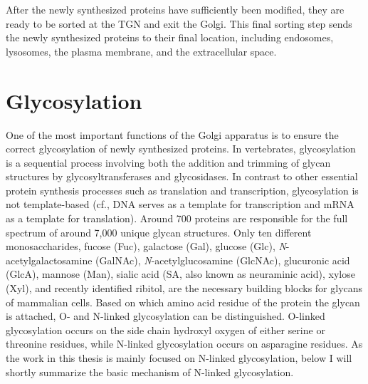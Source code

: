 After the newly synthesized proteins have sufficiently been modified, they are ready to be sorted at the TGN and exit the Golgi\cite{guo_protein_2014}. This final sorting step sends the newly synthesized proteins to their final location, including endosomes, lysosomes, the plasma membrane, and the extracellular space.


\section{Glycosylation}

One of the most important functions of the Golgi apparatus is to ensure the correct glycosylation of newly synthesized proteins. In vertebrates, glycosylation is a sequential process involving both the addition and trimming of glycan structures by glycosyltransferases and glycosidases\cite{lombard_carbohydrate-active_2014}. In contrast to other essential protein synthesis processes such as translation and transcription, glycosylation is not template-based (cf., DNA serves as a template for transcription and mRNA as a template for translation)\cite{gabius_sugar_2018}. Around 700 proteins are responsible for the full spectrum of around 7,000 unique glycan structures. Only ten different monosaccharides, fucose (Fuc), galactose (Gal), glucose (Glc), \emph{N}-acetylgalactosamine (GalNAc), \emph{N}-acetylglucosamine (GlcNAc), glucuronic acid (GlcA), mannose (Man), sialic acid (SA, also known as neuraminic acid), xylose (Xyl), and recently identified ribitol, are the necessary building blocks for glycans of mammalian cells\cite{cummings_repertoire_2009,joshi_glycosyltransferase_2018,nairn_handbook_2009,nairn_regulation_2008,narimatsu_atlas_2019,riemersma_human_2015}. Based on which amino acid residue of the protein the glycan is attached, O- and N-linked glycosylation can be distinguished. O-linked glycosylation occurs on the side chain hydroxyl oxygen of either serine or threonine residues, while N-linked glycosylation occurs on asparagine residues. As the work in this thesis is mainly focused on N-linked glycosylation, below I will shortly summarize the basic mechanism of N-linked glycosylation.

